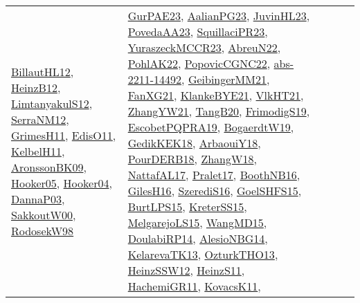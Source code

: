 {\begin{longtable}{lp{3cm}>{\raggedright}p{6cm}>{\raggedright}p{6cm}p{8cm}}
\href{papers/BillautHL12.pdf}{BillautHL12}\cite{BillautHL12}, \href{papers/HeinzB12.pdf}{HeinzB12}\cite{HeinzB12}, \href{articles/LimtanyakulS12.pdf}{LimtanyakulS12}\cite{LimtanyakulS12}, \href{papers/SerraNM12.pdf}{SerraNM12}\cite{SerraNM12}, \href{papers/GrimesH11.pdf}{GrimesH11}\cite{GrimesH11}, \href{papers/EdisO11.pdf}{EdisO11}\cite{EdisO11}, \href{articles/KelbelH11.pdf}{KelbelH11}\cite{KelbelH11}, \href{papers/AronssonBK09.pdf}{AronssonBK09}\cite{AronssonBK09}, \href{articles/Hooker05.pdf}{Hooker05}\cite{Hooker05}, \href{papers/Hooker04.pdf}{Hooker04}\cite{Hooker04}, \href{papers/DannaP03.pdf}{DannaP03}\cite{DannaP03}, \href{articles/SakkoutW00.pdf}{SakkoutW00}\cite{SakkoutW00}, \href{papers/RodosekW98.pdf}{RodosekW98}\cite{RodosekW98} & \href{articles/GurPAE23.pdf}{GurPAE23}\cite{GurPAE23}, \href{papers/AalianPG23.pdf}{AalianPG23}\cite{AalianPG23}, \href{papers/JuvinHL23.pdf}{JuvinHL23}\cite{JuvinHL23}, \href{papers/PovedaAA23.pdf}{PovedaAA23}\cite{PovedaAA23}, \href{papers/SquillaciPR23.pdf}{SquillaciPR23}\cite{SquillaciPR23}, \href{articles/YuraszeckMCCR23.pdf}{YuraszeckMCCR23}\cite{YuraszeckMCCR23}, \href{articles/AbreuN22.pdf}{AbreuN22}\cite{AbreuN22}, \href{articles/PohlAK22.pdf}{PohlAK22}\cite{PohlAK22}, \href{papers/PopovicCGNC22.pdf}{PopovicCGNC22}\cite{PopovicCGNC22}, \href{articles/abs-2211-14492.pdf}{abs-2211-14492}\cite{abs-2211-14492}, \href{papers/GeibingerMM21.pdf}{GeibingerMM21}\cite{GeibingerMM21}, \href{articles/FanXG21.pdf}{FanXG21}\cite{FanXG21}, \href{papers/KlankeBYE21.pdf}{KlankeBYE21}\cite{KlankeBYE21}, \href{articles/VlkHT21.pdf}{VlkHT21}\cite{VlkHT21}, \href{articles/ZhangYW21.pdf}{ZhangYW21}\cite{ZhangYW21}, \href{papers/TangB20.pdf}{TangB20}\cite{TangB20}, \href{papers/FrimodigS19.pdf}{FrimodigS19}\cite{FrimodigS19}, \href{articles/EscobetPQPRA19.pdf}{EscobetPQPRA19}\cite{EscobetPQPRA19}, \href{papers/BogaerdtW19.pdf}{BogaerdtW19}\cite{BogaerdtW19}, \href{articles/GedikKEK18.pdf}{GedikKEK18}\cite{GedikKEK18}, \href{papers/ArbaouiY18.pdf}{ArbaouiY18}\cite{ArbaouiY18}, \href{articles/PourDERB18.pdf}{PourDERB18}\cite{PourDERB18}, \href{articles/ZhangW18.pdf}{ZhangW18}\cite{ZhangW18}, \href{articles/NattafAL17.pdf}{NattafAL17}\cite{NattafAL17}, \href{papers/Pralet17.pdf}{Pralet17}\cite{Pralet17}, \href{papers/BoothNB16.pdf}{BoothNB16}\cite{BoothNB16}, \href{papers/GilesH16.pdf}{GilesH16}\cite{GilesH16}, \href{papers/SzerediS16.pdf}{SzerediS16}\cite{SzerediS16}, \href{articles/GoelSHFS15.pdf}{GoelSHFS15}\cite{GoelSHFS15}, \href{papers/BurtLPS15.pdf}{BurtLPS15}\cite{BurtLPS15}, \href{papers/KreterSS15.pdf}{KreterSS15}\cite{KreterSS15}, \href{papers/MelgarejoLS15.pdf}{MelgarejoLS15}\cite{MelgarejoLS15}, \href{articles/WangMD15.pdf}{WangMD15}\cite{WangMD15}, \href{papers/DoulabiRP14.pdf}{DoulabiRP14}\cite{DoulabiRP14}, \href{papers/AlesioNBG14.pdf}{AlesioNBG14}\cite{AlesioNBG14}, \href{papers/KelarevaTK13.pdf}{KelarevaTK13}\cite{KelarevaTK13}, \href{articles/OzturkTHO13.pdf}{OzturkTHO13}\cite{OzturkTHO13}, \href{articles/HeinzSSW12.pdf}{HeinzSSW12}\cite{HeinzSSW12}, \href{papers/HeinzS11.pdf}{HeinzS11}\cite{HeinzS11}, \href{articles/HachemiGR11.pdf}{HachemiGR11}\cite{HachemiGR11}, \href{articles/KovacsK11.pdf}{KovacsK11}\cite{KovacsK11}, 
\end{longtable}}
